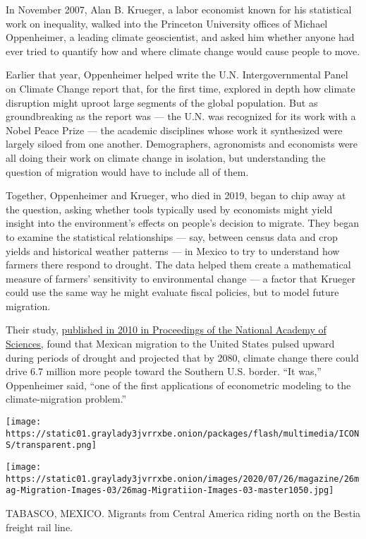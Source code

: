 In November 2007, Alan B. Krueger, a labor economist known for his
statistical work on inequality, walked into the Princeton University
offices of Michael Oppenheimer, a leading climate geoscientist, and
asked him whether anyone had ever tried to quantify how and where
climate change would cause people to move.

Earlier that year, Oppenheimer helped write the U.N. Intergovernmental
Panel on Climate Change report that, for the first time, explored in
depth how climate disruption might uproot large segments of the global
population. But as groundbreaking as the report was --- the U.N. was
recognized for its work with a Nobel Peace Prize --- the academic
disciplines whose work it synthesized were largely siloed from one
another. Demographers, agronomists and economists were all doing their
work on climate change in isolation, but understanding the question of
migration would have to include all of them.

Together, Oppenheimer and Krueger, who died in 2019, began to chip away
at the question, asking whether tools typically used by economists might
yield insight into the environment's effects on people's decision to
migrate. They began to examine the statistical relationships --- say,
between census data and crop yields and historical weather patterns ---
in Mexico to try to understand how farmers there respond to drought. The
data helped them create a mathematical measure of farmers' sensitivity
to environmental change --- a factor that Krueger could use the same way
he might evaluate fiscal policies, but to model future migration.

Their study, \href{https://www.pnas.org/content/107/32/14257}{published
in 2010 in Proceedings of the National Academy of Sciences,} found that
Mexican migration to the United States pulsed upward during periods of
drought and projected that by 2080, climate change there could drive 6.7
million more people toward the Southern U.S. border. ``It was,''
Oppenheimer said, ``one of the first applications of econometric
modeling to the climate-migration problem.''

\texttt{[image: https://static01.graylady3jvrrxbe.onion/packages/flash/multimedia/ICONS/transparent.png]}

\texttt{[image: https://static01.graylady3jvrrxbe.onion/images/2020/07/26/magazine/26mag-Migration-Images-03/26mag-Migratiion-Images-03-master1050.jpg]}

TABASCO, MEXICO. Migrants from Central America riding north on the
Bestia freight rail line.

